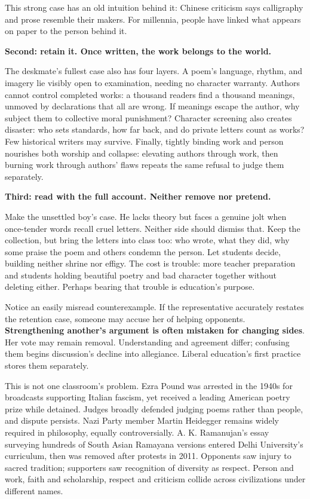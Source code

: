 This strong case has an old intuition behind it: Chinese criticism says calligraphy and prose resemble their makers. For millennia, people have linked what appears on paper to the person behind it.

\textbf{Second: retain it. Once written, the work belongs to the world.}

The deskmate's fullest case also has four layers. A poem's language, rhythm, and imagery lie visibly open to examination, needing no character warranty. Authors cannot control completed works: a thousand readers find a thousand meanings, unmoved by declarations that all are wrong. If meanings escape the author, why subject them to collective moral punishment? Character screening also creates disaster: who sets standards, how far back, and do private letters count as works? Few historical writers may survive. Finally, tightly binding work and person nourishes both worship and collapse: elevating authors through work, then burning work through authors' flaws repeats the same refusal to judge them separately.

\textbf{Third: read with the full account. Neither remove nor pretend.}

Make the unsettled boy's case. He lacks theory but faces a genuine jolt when once-tender words recall cruel letters. Neither side should dismiss that. Keep the collection, but bring the letters into class too: who wrote, what they did, why some praise the poem and others condemn the person. Let students decide, building neither shrine nor effigy. The cost is trouble: more teacher preparation and students holding beautiful poetry and bad character together without deleting either. Perhaps bearing that trouble is education's purpose.

Notice an easily misread counterexample. If the representative accurately restates the retention case, someone may accuse her of helping opponents. \textbf{Strengthening another's argument is often mistaken for changing sides}. Her vote may remain removal. Understanding and agreement differ; confusing them begins discussion's decline into allegiance. Liberal education's first practice stores them separately.

This is not one classroom's problem. Ezra Pound was arrested in the 1940s for broadcasts supporting Italian fascism, yet received a leading American poetry prize while detained. Judges broadly defended judging poems rather than people, and dispute persists. Nazi Party member Martin Heidegger remains widely required in philosophy, equally controversially. A. K. Ramanujan's essay surveying hundreds of South Asian Ramayana versions entered Delhi University's curriculum, then was removed after protests in 2011. Opponents saw injury to sacred tradition; supporters saw recognition of diversity as respect. Person and work, faith and scholarship, respect and criticism collide across civilizations under different names.

